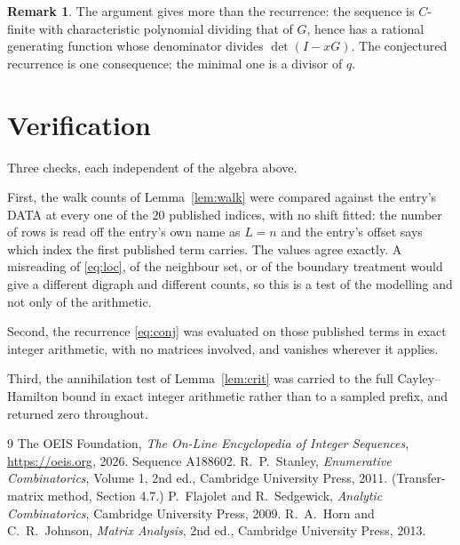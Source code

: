 \documentclass[11pt,a4paper]{article}
\theoremstyle{plain}
\theoremstyle{definition}
\newtheorem{remark}[theorem]{Remark}
\begin{document}
\begin{remark}
The argument gives more than the recurrence: the sequence is $C$-finite with characteristic
polynomial dividing that of $G$, hence has a rational generating function whose denominator
divides $\det(I-xG)$. The conjectured recurrence is one consequence; the minimal one is a
divisor of $q$.
\end{remark}

\section{Verification}

Three checks, each independent of the algebra above.

First, the walk counts of Lemma~\ref{lem:walk} were compared against the entry's DATA at
every one of the $20$ published indices, with no shift fitted: the number of rows is
read off the entry's own name as $L=n$ and the entry's offset says which index the first
published term carries. The values agree exactly. A misreading of \eqref{eq:loc}, of the
neighbour set, or of the boundary treatment would give a different digraph and different
counts, so this is a test of the modelling and not only of the arithmetic.

Second, the recurrence \eqref{eq:conj} was evaluated on those published terms in exact
integer arithmetic, with no matrices involved, and vanishes wherever it applies.

Third, the annihilation test of Lemma~\ref{lem:crit} was carried to the full
Cayley--Hamilton bound in exact integer arithmetic rather than to a sampled prefix, and
returned zero throughout.

\begin{thebibliography}{9}
 The OEIS Foundation, \emph{The On-Line Encyclopedia of Integer
Sequences}, \url{https://oeis.org}, 2026. Sequence A188602.
 R.~P.~Stanley, \emph{Enumerative Combinatorics}, Volume 1, 2nd ed.,
Cambridge University Press, 2011. (Transfer-matrix method, Section 4.7.)
 P.~Flajolet and R.~Sedgewick, \emph{Analytic Combinatorics}, Cambridge
University Press, 2009.
 R.~A.~Horn and C.~R.~Johnson, \emph{Matrix Analysis}, 2nd ed., Cambridge
University Press, 2013.
\end{thebibliography}
\end{document}
